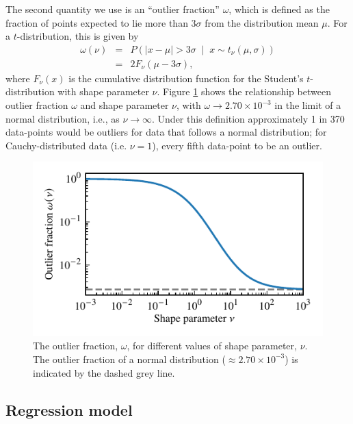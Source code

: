 \documentclass[fleqn,usenatbib]{rasti}
\newcommand{\studentt}[2]{t_\nu \left( #1, #2 \right)}
\begin{document}
The second quantity we use is an ``outlier fraction'' $\omega$, which
is defined as the fraction of points expected to lie more than $3\sigma$ from the
distribution mean $\mu$. For a $t$-distribution, this is given by
\begin{eqnarray}
    \omega(\nu)
    &=& P\left(
        \left|x - \mu \right| > 3 \sigma \;
        \middle| \;
        x \sim \studentt{\mu}{\sigma}
    \right) \label{eqn:model.outlier_frac}\\
    &=& 2 F_\nu \left(\mu - 3 \sigma \right),
\end{eqnarray}
where $F_\nu(x)$ is the cumulative distribution function for the Student's
$t$-distribution with shape parameter $\nu$. Figure \ref{fig:model.outlier_frac}
shows the relationship between outlier fraction $\omega$ and shape parameter
$\nu$, with $\omega \rightarrow 2.70 \times 10^{-3} $ in the limit of a normal
distribution, i.e., as $\nu \rightarrow \infty$.  Under this definition
approximately 1 in 370 data-points would be outliers for data that follows a
normal distribution; for Cauchy-distributed data (i.e. $\nu = 1$), every fifth
data-point to be an outlier.

\begin{figure}
	\includegraphics{graphics/outlier_frac.pdf}
    \caption{The outlier fraction, $\omega$, for different values of shape
    parameter, $\nu$. The outlier fraction of a normal distribution ($\approx
    2.70 \times 10^{-3}$) is indicated by the dashed grey line.}
    \label{fig:model.outlier_frac}
\end{figure}

\subsection{Regression model}
\label{sec:formalism.model}
\end{document}
